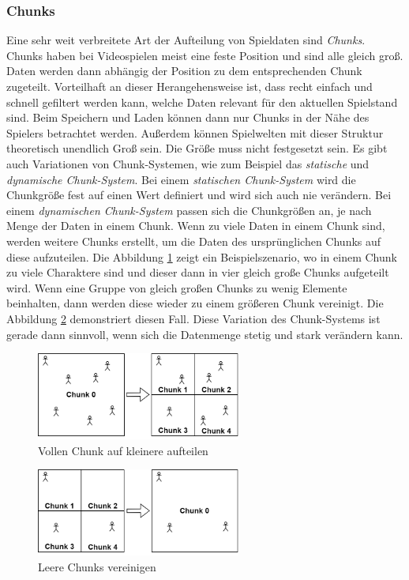 \subsubsection{Chunks} \label{sssect:chunks}
Eine sehr weit verbreitete Art der Aufteilung von Spieldaten sind \textit{Chunks}. Chunks haben bei Videospielen meist eine feste Position und sind alle gleich groß. Daten werden dann abhängig der Position zu dem entsprechenden Chunk zugeteilt. Vorteilhaft an dieser Herangehensweise ist, dass recht einfach und schnell gefiltert werden kann, welche Daten relevant für den aktuellen Spielstand sind. Beim Speichern und Laden können dann nur Chunks in der Nähe des Spielers betrachtet werden. Außerdem können Spielwelten mit dieser Struktur theoretisch unendlich Groß sein. Die Größe muss nicht festgesetzt sein. Es gibt auch Variationen von Chunk-Systemen, wie zum Beispiel das \textit{statische} und \textit{dynamische Chunk-System}. Bei einem \textit{statischen Chunk-System} wird die Chunkgröße fest auf einen Wert definiert und wird sich auch nie verändern. Bei einem \textit{dynamischen Chunk-System} passen sich die Chunkgrößen an, je nach Menge der Daten in einem Chunk. Wenn zu viele Daten in einem Chunk sind, werden weitere Chunks erstellt, um die Daten des ursprünglichen Chunks auf diese aufzuteilen. Die Abbildung \ref{fig:chunkSplitting} zeigt ein Beispielszenario, wo in einem Chunk zu viele Charaktere sind und dieser dann in vier gleich große Chunks aufgeteilt wird. Wenn eine Gruppe von gleich großen Chunks zu wenig Elemente beinhalten, dann werden diese wieder zu einem größeren Chunk vereinigt. Die Abbildung \ref{fig:chunkJoining} demonstriert diesen Fall. Diese Variation des Chunk-Systems ist gerade dann sinnvoll, wenn sich die Datenmenge stetig und stark verändern kann. 

\begin{figure}[htp]
    \centering
    \includegraphics[width=0.6\textwidth]{images/chunkSplitting.png}
    \caption{Vollen Chunk auf kleinere aufteilen}
    \label{fig:chunkSplitting}
\end{figure}

\begin{figure}[htp]
    \centering
    \includegraphics[width=0.6\textwidth]{images/chunkJoining.png}
    \caption{Leere Chunks vereinigen}
    \label{fig:chunkJoining}
\end{figure}

